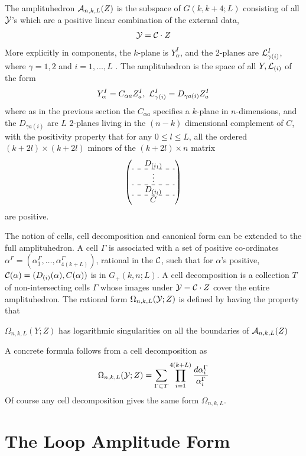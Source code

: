 \documentclass[12pt,nohyper,twosided]{JHEP3}
\newcommand{\be}{\begin{eqnarray}}
\newcommand{\ee}{\end{eqnarray}}
\begin{document}
The amplituhedron ${\cal A}_{n,k,L}(Z)$ is the subspace of
$G(k,k+4;L)$ consisting of all ${\cal Y}$'s which are a positive
linear combination of the external data, \be {\cal Y} = {\cal C}
\cdot Z \ee More explicitly in components, the $k$-plane is
$Y_{\alpha}^I$, and the 2-planes are ${\cal L}_{\gamma (i)}^I$,
where $\gamma = 1,2$ and  $i = 1, \dots, L$ . The amplituhedron is
the space of all $Y, {\cal L}_{(i)}$ of the form \be Y_{\alpha}^I =
C_{\alpha a} Z_a^I, \, \, {\cal L}_{\gamma (i)}^{I} = D_{\gamma a
(i)} Z_a^I \ee where as in the previous section the $C_{\alpha a}$
specifies a $k$-plane in $n$-dimensions, and the $D_{\gamma a (i)}$
are $L$ 2-planes living in the $(n-k)$ dimensional complement of
$C$, with the positivity property that for any $0 \leq l \leq L$,
all the ordered $(k + 2l) \times (k+2l)$ minors of the $(k + 2
l) \times n$ matrix \be \left(\begin{array}{ccc} & D_{(i_1)} & \\
\hdashline & \vdots &  \\ \hdashline & D_{(i_l)} & \\ \hdashline & C
\end{array} \right) \ee are positive.

The notion of cells, cell decomposition and canonical form
can be extended to the full amplituhedron. A cell $\Gamma$ is
associated with a set of positive co-ordinates $\alpha^\Gamma =
(\alpha^\Gamma_1, \dots, \alpha^\Gamma_{4(k + L)})$, rational in the ${\cal C}$, such that for $\alpha$'s positive,
${\cal C}(\alpha) = (D_{(i)}(\alpha), C(\alpha))$ is in $G_+(k,n;L)$.  A
cell decomposition is a collection $T$ of non-intersecting cells
$\Gamma$ whose images under ${\cal Y} = {\cal C} \cdot Z$ cover the
entire amplituhedron. The rational form $\Omega_{n,k,L}({\cal Y}; Z)$ is
defined by having the property that

\begin{center}
$\Omega_{n,k,L}(Y;Z)$ has logarithmic singularities on all the
boundaries of ${\cal A}_{n,k,L}(Z)$
\end{center}

A concrete formula follows from a cell decomposition as \be
\Omega_{n,k,L}({\cal Y}; Z) = \sum_{\Gamma \subset T} \prod_{i =
1}^{4(k + L)} \frac{d \alpha_i^\Gamma}{\alpha_i^\Gamma} \ee Of course any cell
decomposition gives the same form $\Omega_{n,k,L}$.


\section{The Loop Amplitude Form}
\end{document}
